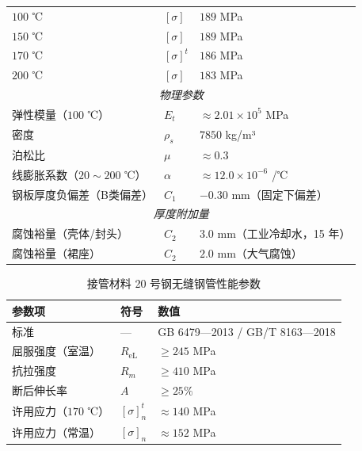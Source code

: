 \begin{table}[htbp]
\begin{tabularx}{\textwidth}{@{}l l l @{}}
    $100$ ℃                   & $[\sigma]$        & $189$ MPa \\
    $150$ ℃                   & $[\sigma]$        & $189$ MPa \\
    $170$ ℃                   & $[\sigma]^t$      & $186$ MPa \\
    $200$ ℃                   & $[\sigma]$        & $183$ MPa \\
    \midrule
    \multicolumn{3}{c}{\textit{物理参数}} \\
    \midrule
    弹性模量（$100$ ℃）       & $E_t$             & $\approx 2.01\times10^5$ MPa \\
    密度                       & $\rho_s$          & $7850$ kg/m³ \\
    泊松比                     & $\mu$             & $\approx 0.3$ \\
    线膨胀系数（$20\sim200$ ℃）& $\alpha$          & $\approx 12.0\times10^{-6}$ /℃ \\
    钢板厚度负偏差（B类偏差）  & $C_1$             & $-0.30$ mm（固定下偏差） \\
    \midrule
    \multicolumn{3}{c}{\textit{厚度附加量}} \\
    \midrule
    腐蚀裕量（壳体/封头）      & $C_2$             & $3.0$ mm（工业冷却水，15 年） \\
    腐蚀裕量（裙座）          & $C_2$             & $2.0$ mm（大气腐蚀） \\
    \bottomrule
  \end{tabularx}
\end{table}

\begin{table}[htbp]
  \centering
  \caption{接管材料 20 号钢无缝钢管性能参数}
  \label{tab:cad-20steel}
  \small\renewcommand{\arraystretch}{1.1}
  \setlength{\tabcolsep}{8pt}
  \begin{tabularx}{\textwidth}{@{}l l l @{}}
    \toprule
    \textbf{参数项} & \textbf{符号} & \textbf{数值} \\
    \midrule
    标准                    & —        & GB 6479—2013 / GB/T 8163—2018 \\
    屈服强度（室温）        & $R_{\text{eL}}$ & $\ge 245$ MPa \\
    抗拉强度                & $R_m$           & $\ge 410$ MPa \\
    断后伸长率              & $A$             & $\ge 25\%$ \\
    许用应力（$170$ ℃）    & $[\sigma]^t_n$  & $\approx 140$ MPa \\
    许用应力（常温）        & $[\sigma]_n$    & $\approx 152$ MPa \\
    \bottomrule
  \end{tabularx}
\end{table}

